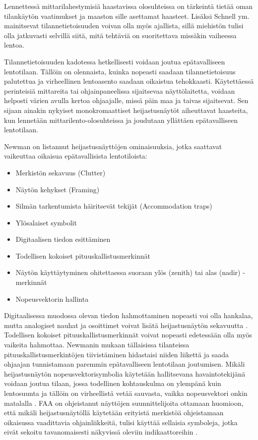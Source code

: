 \documentclass[utf8,bachelor,manualbib]{gradu3}
\begin{document}
Lennettessä mittarilahestymisiä haastavissa olosuhteissa on tärkeintä tietää oman tilankäytön vaatimukset ja maaston sille asettamat haasteet. Lisäksi Schnell ym. \citeyearpar{schnellym2004} mainitsevat tilannetietoisuuden voivan olla myös ajallista, sillä miehistön tulisi olla jatkuvasti selvillä siitä, mitä tehtäviä on suoritettava missäkin vaiheessa lentoa.

Tilannetietoisuuden kadotessa hetkellisesti voidaan joutua epätavalliseen lentotilaan. Tällöin on olennaista, kuinka nopeasti saadaan tilannetietoisuus palutettua ja virheellinen lentoasento saadaan oikaistua tehokkaasti. Käytettäessä perinteisiä mittareita tai ohjainpaneelissa sijaitsevaa näyttölaitetta, voidaan helposti värien avulla kertoa ohjaajalle, missä päin maa ja taivas sijaitsevat. Sen sijaan ainakin nykyiset monokromaattiset heijastusnäytöt aiheuttavat haasteita, kun lennetään mittarilento-olosuhteissa ja joudutaan yllättäen epätavalliseen lentotilaan.

Newman \citeyearpar{newman2000} on listannut heijastusnäyttöjen ominaisuuksia, jotka saattavat vaikeuttaa oikaisua epätavallisista lentotiloista:

\begin{itemize}
\item Merkistön sekavuus (Clutter)
\item Näytön kehykset (Framing)
\item Silmän tarkentumista häiritsevät tekijät (Accommodation traps)
\item Ylösalaiset symbolit
\item Digitaalisen tiedon esittäminen
\item Todellisen kokoiset pituuskallistusmerkinnät
\item Näytön käyttäytyminen ohitettaessa suoraan ylös (zenith) tai alas (nadir) -merkinnät
\item Nopeusvektorin hallinta
\end{itemize} 

Digitaalisessa muodossa olevan tiedon hahmottaminen nopeasti voi olla hankalaa, mutta analogiset nauhat ja osoittimet voivat lisätä heijastusnäytön sekavuutta \citeyearpar{zuschlag2003}. Todellisen kokoiset pituuskallistusmerkinnät voivat nopeasti edetessään olla myös vaikeita hahmottaa. Newmanin \citeyearpar{newman1995} mukaan tällaisissa tilanteissa pituuskallistusmerkintöjen tiivistäminen hidastaisi niiden liikettä ja saada ohjaajan tunnistamaan paremmin epätavalliseen lentotilaan joutumisen. Mikäli heijastusnäytön nopeusvektorisymbolia käytetään hallitsevana havaintotekijänä voidaan joutua tilaan, jossa todellinen kohtauskulma on ylempänä kuin lentosuunta ja tällöin on virheellistä vetää sauvasta, vaikka nopeusvektori onkin matalalla \citep{crawfordneal2006}. FAA on ohjeistanut näyttöjen suunnittelijoita ottamaan huomioon, että mikäli heijastusnäytöllä käytetään erityistä merkistöä ohjeistamaan oikaisussa vaadittavia ohjainliikkeitä, tulisi käyttää sellaisia symboleja, jotka eivät sekoitu tavanomaisesti näkyvissä oleviin indikaattoreihin \citep{crawfordneal2006}.
\end{document}
